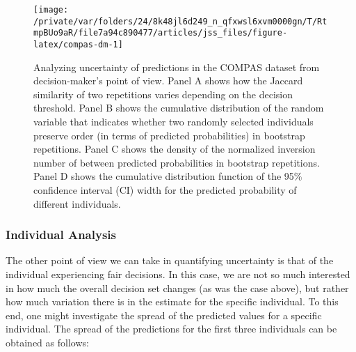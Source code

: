 \documentclass[
  nojss]{jss}
\begin{document}
\begin{CodeChunk}
\begin{figure}

{\centering \texttt{[image: /private/var/folders/24/8k48jl6d249\_n\_qfxwsl6xvm0000gn/T/RtmpBUo9aR/file7a94c890477/articles/jss\_files/figure-latex/compas-dm-1]} 

}

\caption[Analyzing uncertainty of predictions in the COMPAS dataset from decision-maker's point of view]{Analyzing uncertainty of predictions in the COMPAS dataset from decision-maker's point of view. Panel A shows how the Jaccard similarity of two repetitions varies depending on the decision threshold. Panel B shows the cumulative distribution of the random variable that indicates whether two randomly selected individuals preserve order (in terms of predicted probabilities) in bootstrap repetitions. Panel C shows the density of the normalized inversion number of between predicted probabilities in bootstrap repetitions. Panel D shows the cumulative distribution function of the 95\% confidence interval (CI) width for the predicted probability of different individuals.}\label{fig:compas-dm}
\end{figure}
\end{CodeChunk}

\hypertarget{individual-analysis}{%
\subsubsection{Individual Analysis}\label{individual-analysis}}

The other point of view we can take in quantifying uncertainty is that
of the individual experiencing fair decisions. In this case, we are not
so much interested in how much the overall decision set changes (as was
the case above), but rather how much variation there is in the estimate
for the specific individual. To this end, one might investigate the
spread of the predicted values for a specific individual. The spread of
the predictions for the first three individuals can be obtained as
follows:

\begin{CodeChunk}
\end{CodeChunk}
\end{document}
